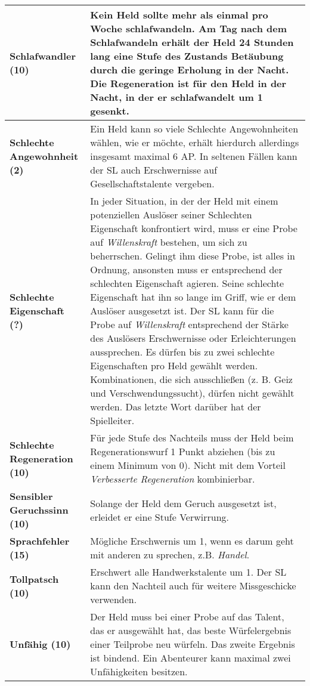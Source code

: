 \begin{longtable}{|p{5cm}|p{11cm}|}
\textbf{Schlafwandler (10)} & Kein Held sollte mehr als einmal pro Woche schlafwandeln. Am Tag nach dem Schlafwandeln erhält der Held 24 Stunden lang eine Stufe des Zustands Betäubung durch die geringe Erholung in der Nacht. Die Regeneration ist für den Held in der Nacht, in der er schlafwandelt um 1 gesenkt. \\ \hline

\textbf{Schlechte Angewohnheit (2)} & Ein Held kann so viele Schlechte Angewohnheiten wählen, wie er möchte, erhält hierdurch allerdings insgesamt maximal 6 AP. In seltenen Fällen kann der SL auch Erschwernisse auf Gesellschaftstalente vergeben. \\ \hline

\textbf{Schlechte Eigenschaft (?)} & In jeder Situation, in der der Held mit einem potenziellen Auslöser seiner Schlechten Eigenschaft konfrontiert wird, muss er eine Probe auf \textit{Willenskraft} bestehen, um sich zu beherrschen. Gelingt ihm diese Probe, ist alles in Ordnung, ansonsten muss er entsprechend der schlechten Eigenschaft agieren. Seine schlechte Eigenschaft hat ihn so lange im Griff, wie er dem Auslöser ausgesetzt ist. Der SL kann für die Probe auf \textit{Willenskraft} entsprechend der Stärke des Auslösers Erschwernisse oder Erleichterungen aussprechen. Es dürfen bis zu zwei schlechte Eigenschaften pro Held gewählt werden. Kombinationen, die sich ausschließen (z. B. Geiz und Verschwendungssucht), dürfen nicht gewählt werden. Das letzte Wort darüber hat der Spielleiter. \\ \hline

\textbf{Schlechte Regeneration (10)} & Für jede Stufe des Nachteils muss der Held beim Regenerationswurf 1 Punkt abziehen (bis zu einem Minimum von 0). Nicht mit dem Vorteil \textit{Verbesserte Regeneration} kombinierbar. \\ \hline

\textbf{Sensibler Geruchssinn (10)} & Solange der Held dem Geruch ausgesetzt ist, erleidet er eine Stufe Verwirrung. \\ \hline

\textbf{Sprachfehler (15)} & Mögliche Erschwernis um 1, wenn es darum geht mit anderen zu sprechen, z.B. \textit{Handel}. \\ \hline

\textbf{Tollpatsch (10)} & Erschwert alle Handwerkstalente um 1. Der SL kann den Nachteil auch für weitere Missgeschicke verwenden. \\ \hline

\textbf{Unfähig (10)} & Der Held muss bei einer Probe auf das Talent, das er ausgewählt hat, das beste Würfelergebnis einer Teilprobe neu würfeln. Das zweite Ergebnis ist bindend. Ein Abenteurer kann maximal zwei Unfähigkeiten besitzen. \\ \hline


\end{longtable}
